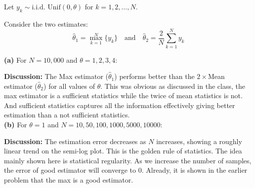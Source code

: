 \documentclass[12pt,a4paper,onecolumn]{exam}
\begin{document}
\begin{solution}
Let $y_k \sim \text{i.i.d. Unif}(0, \theta)$ for $k = 1, 2, \ldots, N$.

Consider the two estimates:
\[
\hat{\theta}_1 = \max_{k=1}^{N}\{y_k\} \quad \text{and} \quad \hat{\theta}_2 = \frac{2}{N} \sum_{k=1}^{N} y_k
\]

\textbf{(a)} For $N = 10,000$ and $\theta = 1, 2, 3, 4$:


\textbf{Discussion:} The Max estimator ($\hat{\theta}_1$) performs better than the $2 \times$Mean estimator ($\hat{\theta}_2$) for all values of $\theta$. This was obvious as discussed in the class, the max estimator is a sufficient statistics while the twice of mean statistics is not. And sufficient statistics captures all the information effectively giving better estimation than a not sufficient statistics. 
\phantom{123}\\


\textbf{(b)} For $\theta = 1$ and $N = 10, 50, 100, 1000, 5000, 10000$:


\textbf{Discussion:} The estimation error decreases as $N$ increases, showing a roughly linear trend on the semi-log plot. This is the golden rule of statistics. The idea mainly shown here is statistical regularity. As we increase the number of samples, the error of good estimator will converge to 0. Already, it is shown in the earlier problem that the max is a good estimator.  
\end{solution}
\end{document}

